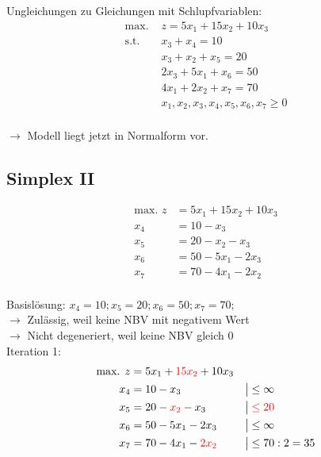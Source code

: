 \documentclass[a4paper,11pt]{article}
\begin{document}
\vspace{4mm}
    
Ungleichungen zu Gleichungen mit Schlupfvariablen:
\begin{align*}
    \text{max. } & z = 5x_{1} + 15x_{2} + 10x_{3} \\
    \text{s.t. } & x_{3} + x_{4} = 10 \\
    & x_{3} + x_{2} + x_{5} = 20 \\
    & 2x_{3} + 5x_{1} + x_{6} = 50 \\
    & 4x_{1} + 2x_{2} + x_{7} = 70 \\
    & x_{1}, x_{2}, x_{3}, x_{4}, x_{5}, x_{6}, x_{7} \ge 0 \\
\end{align*}

$\to$ Modell liegt jetzt in Normalform vor.

\subsection*{Simplex II}
\begin{align*}
    \text{max. } z &= 5x_{1} + 15x_{2} + 10x_{3} \\
    x_{4} &= 10 - x_{3} \\
    x_{5} &= 20 - x_{2} - x_{3} \\
    x_{6} &= 50 - 5x_{1} - 2x_{3} \\
    x_{7} &= 70 - 4x_{1} - 2x_{2} \\
\end{align*}

Basislösung: $x_{4}=10; x_{5}=20; x_{6}=50; x_{7}=70;$ \\
$\to$ Zulässig, weil keine NBV mit negativem Wert \\
$\to$ Nicht degeneriert, weil keine NBV gleich 0 \\

Iteration 1:
\begin{align*}
    \text{max. } z &= 5x_{1} + {\color{red}15x_{2}} + 10x_{3} && \\
    x_{4} &= 10 - x_{3} && \big| \le \infty \\
    x_{5} &= 20 - {\color{red}x_{2}} - x_{3} && \big| \color{red} \le 20 \\
    x_{6} &= 50 - 5x_{1} - 2x_{3} && \big| \le \infty \\
    x_{7} &= 70 - 4x_{1} - {\color{red}2x_{2}} && \big| \le 70:2=35 \\
\end{align*}
\end{document}
